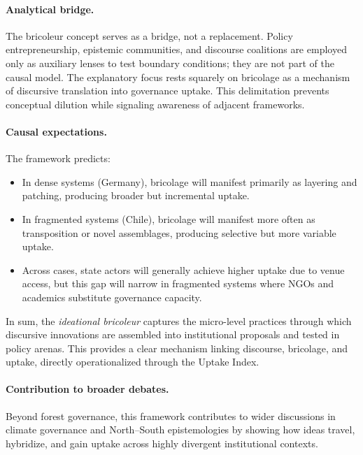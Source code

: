 \paragraph{Analytical bridge.}
The bricoleur concept serves as a bridge, not a replacement. Policy entrepreneurship, 
epistemic communities, and discourse coalitions are employed only as auxiliary lenses 
to test boundary conditions; they are not part of the causal model. The explanatory 
focus rests squarely on bricolage as a mechanism of discursive translation into 
governance uptake. This delimitation prevents conceptual dilution while signaling 
awareness of adjacent frameworks.

\paragraph{Causal expectations.}
The framework predicts:  
\begin{itemize}
    \item In dense systems (Germany), bricolage will manifest primarily as layering 
    and patching, producing broader but incremental uptake.  
    \item In fragmented systems (Chile), bricolage will manifest more often as 
    transposition or novel assemblages, producing selective but more variable uptake.  
    \item Across cases, state actors will generally achieve higher uptake due to venue 
    access, but this gap will narrow in fragmented systems where NGOs and academics 
    substitute governance capacity.  
\end{itemize}

In sum, the \textit{ideational bricoleur} captures the micro-level practices through 
which discursive innovations are assembled into institutional proposals and tested in 
policy arenas. This provides a clear mechanism linking discourse, bricolage, and 
uptake, directly operationalized through the Uptake Index.


\paragraph{Contribution to broader debates.}
Beyond forest governance, this framework contributes to wider discussions in 
climate governance and North–South epistemologies by showing how ideas travel, 
hybridize, and gain uptake across highly divergent institutional contexts.